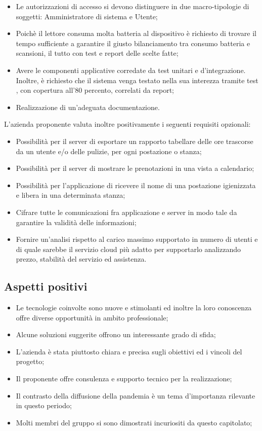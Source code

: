 \begin{itemize}
\item Le autorizzazioni di accesso si devono distinguere in due macro-tipologie di soggetti: Amministratore di sistema e Utente;
\item Poichè il lettore  consuma molta batteria al dispositivo è richiesto di trovare il tempo sufficiente a garantire il giusto bilanciamento tra consumo batteria e scansioni, il tutto con test e report delle scelte fatte;
\item Avere le componenti applicative corredate da test unitari e d’integrazione. Inoltre, è richiesto che il sistema venga testato nella sua interezza tramite test , con copertura all'80 percento, correlati da report;
\item Realizzazione di un'adeguata documentazione.
\end{itemize}

L’azienda proponente valuta inoltre positivamente i seguenti requisiti opzionali:
\begin{itemize}    
\item Possibilità per il server di esportare un rapporto tabellare delle ore trascorse da un utente e/o delle pulizie, per ogni postazione o stanza;
\item Possibilità per il server di mostrare le prenotazioni in una vista a calendario;
\item Possibilità per l'applicazione di ricevere il nome di una postazione igienizzata e libera in una determinata stanza; 
\item Cifrare tutte le comunicazioni fra applicazione e server in modo tale da garantire la validità delle informazioni;
\item Fornire un’analisi rispetto al carico massimo supportato in numero di utenti e di quale sarebbe il servizio cloud più adatto per supportarlo analizzando prezzo, stabilità  del servizio ed assistenza.
\end{itemize}

\subsection{Aspetti positivi}
\begin{itemize}
\item Le tecnologie coinvolte sono nuove e stimolanti ed inoltre la loro conoscenza offre diverse opportunità in ambito professionale;
\item Alcune soluzioni suggerite offrono un interessante grado di sfida;
\item L'azienda è stata piuttosto chiara e precisa sugli obiettivi ed i vincoli del progetto;
\item Il proponente offre consulenza e supporto tecnico per la realizzazione;
\item Il contrasto della diffusione della pandemia è un tema d'importanza rilevante in questo periodo;
\item Molti membri del gruppo si sono dimostrati incuriositi da questo capitolato;

\end{itemize}

